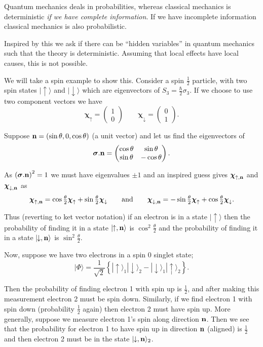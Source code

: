 \documentclass{notes}
\newcommand{\ket}[1]{|#1\rangle}
\newcommand{\sv}{\boldsymbol{\sigma}}
\newcommand{\cv}{\boldsymbol{\chi}}
\newcommand{\ua}{\!\!\uparrow}
\newcommand{\da}{\!\!\downarrow}
\begin{document}
Quantum mechanics deals in probabilities, whereas classical mechanics
is deterministic \emph{if we have complete information}.  If we have
incomplete information classical mechanics is also probabilistic.

Inspired by this we ask if there can be ``hidden variables'' in quantum
mechanics such that the theory is deterministic.  Assuming that local
effects have local causes, this is not possible.

We will take a spin example to show this.  Consider a spin $\frac{1}{2}$
particle, with two spin states $\ket{\ua}$ and $\ket{\da}$ which
are eigenvectors of $S_3 = \frac{\hbar}{2} \sigma_3$.  If we choose to
use two component vectors we have
\[
\cv_\uparrow = \begin{pmatrix} 1 \\ 0 \end{pmatrix} \qquad
\cv_\downarrow = \begin{pmatrix} 0 \\ 1 \end{pmatrix}.
\]

Suppose $\mathbf{n} = (\sin \theta, 0, \cos \theta)$ (a unit vector) and
let us find the eigenvectors of 
\[
\sv.\vect{n} = \begin{pmatrix} \cos \theta & \sin \theta \\
\sin \theta & - \cos \theta
\end{pmatrix}.
\]

As $\left( \sv.\vect{n}\right)^2 = 1$ we must have eigenvalues $\pm 1$
and an inspired guess gives $\cv_{\uparrow,\vect{n}}$ and
$\cv_{\downarrow,\vect{n}}$ as
\[
\cv_{\uparrow,\vect{n}} = \cos \tfrac{\theta}{2} \cv_\uparrow
+ \sin \tfrac{\theta}{2} \cv_\downarrow \qquad \text{and} \qquad
\cv_{\downarrow,\vect{n}} = - \sin \tfrac{\theta}{2} \cv_\uparrow
+ \cos \tfrac{\theta}{2} \cv_\downarrow.
\]

Thus (reverting to ket vector notation) if an electron is in a state
$\ket{\ua}$ then the probability of finding it in a state
$\ket{\ua,\vect{n}}$ is $\cos^2 \frac{\theta}{2}$ and the probability
of finding it in a state $\ket{\da,\vect{n}}$ is $\sin^2 \frac{\theta}{2}$.

Now, suppose we have two electrons in a spin $0$ singlet state;
\[
\ket{\Phi} = \frac{1}{\sqrt{2}} \left\{ \ket{\ua}_1 \ket{\da}_2 -
\ket{\da}_1 \ket{\ua}_2 \right\}.
\]

Then the probability of finding electron 1 with spin up is $\frac{1}{2}$,
and after making this measurement electron 2 must be spin down.  Similarly,
if we find electron 1 with spin down (probability $\frac{1}{2}$ again) then
electron 2 must have spin up.  More generally, suppose we measure electron
1's spin along direction $\mathbf{n}$.  Then we see that the probability
for electron 1 to have spin up in direction $\mathbf{n}$ (aligned) is
$\frac{1}{2}$ and then electron 2 must be in the state $\ket{\da,\vect{n}}_2$.
\end{document}

